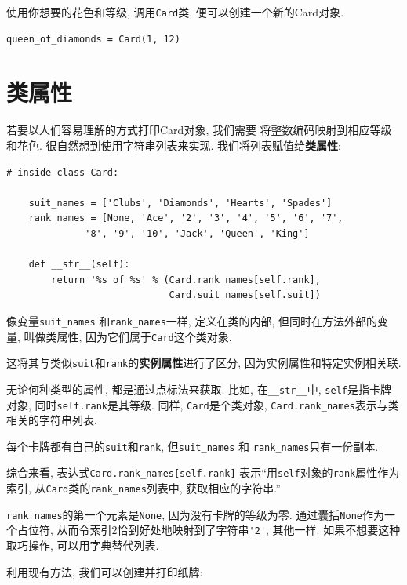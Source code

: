 \documentclass[10pt]{book}
\begin{document}
使用你想要的花色和等级, 调用{\tt Card}类, 便可以创建一个新的Card对象. 

\begin{verbatim}
queen_of_diamonds = Card(1, 12)
\end{verbatim}
%


\section{类属性}
\label{class.attribute}

若要以人们容易理解的方式打印Card对象, 我们需要
将整数编码映射到相应等级和花色. 
很自然想到使用字符串列表来实现. 
我们将列表赋值给{\bf 类属性}:

\begin{verbatim}
# inside class Card:

    suit_names = ['Clubs', 'Diamonds', 'Hearts', 'Spades']
    rank_names = [None, 'Ace', '2', '3', '4', '5', '6', '7', 
              '8', '9', '10', 'Jack', 'Queen', 'King']

    def __str__(self):
        return '%s of %s' % (Card.rank_names[self.rank],
                             Card.suit_names[self.suit])
\end{verbatim}
%
像变量\verb"suit_names" 和\verb"rank_names"一样, 
定义在类的内部, 但同时在方法外部的变量, 叫做类属性, 
因为它们属于{\tt Card}这个类对象. 

这将其与类似{\tt suit}和{\tt rank}的{\bf 实例属性}进行了区分, 
因为实例属性和特定实例相关联. 

无论何种类型的属性, 都是通过点标法来获取. 
比如, 在\verb"__str__"中, {\tt self}是指卡牌对象, 
同时{\tt self.rank}是其等级. 同样, {\tt Card}是个类对象, 
\verb"Card.rank_names"表示与类相关的字符串列表. 

每个卡牌都有自己的{\tt suit}和{\tt rank}, 
但\verb"suit_names" 和 \verb"rank_names"只有一份副本. 

综合来看, 表达式\verb"Card.rank_names[self.rank]" 
表示``用{\tt self}对象的{\tt rank}属性作为索引, 
从{\tt Card}类的\verb"rank_names"列表中, 获取相应的字符串.''

\verb"rank_names"的第一个元素是{\tt None},
因为没有卡牌的等级为零. 
通过囊括{\tt None}作为一个占位符, 
从而令索引2恰到好处地映射到了字符串\verb"'2'", 其他一样. 
如果不想要这种取巧操作, 可以用字典替代列表. 

利用现有方法, 我们可以创建并打印纸牌:
\end{document}
